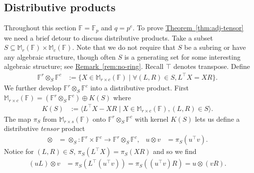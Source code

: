 \documentclass[11pt]{article}
\numberwithin{equation}{section}
\theoremstyle{definition}
\theoremstyle{plain}
\newcommand{\expref}[2]{\hyperref[#2]{#1~\ref{#2}}}
\numberwithin{equation}{section}
\theoremstyle{plain}       %
\theoremstyle{remark}
\theoremstyle{definition}
\numberwithin{figure}{section}
\numberwithin{table}{section}
\newcommand{\bbF}{\mathbb{F}}  %
\begin{document}
\subsection{Distributive products}\label{sec:tensor}
Throughout this section $\bbF=\bbF_p$ and $q=p^e$.  To prove
\expref{Theorem}{thm:adj-tensor} we need a brief detour to discuss distributive
products.  Take a subset $S\subseteq \mathbb{M}_{r}(\bbF)\times
\mathbb{M}_{c}(\bbF)$.  Note that we do not require that $S$ be a subring or
have any algebraic structure, though often $S$ is a generating set for some
interesting algebraic structure; 
%
see \expref{Remark}{rem:no-ring}.     %
Recall $\top$ denotes transpose. Define 
\begin{align}\label{def:otimes-A}
	\bbF^r\otimes_S\bbF^c & := \{X\in \mathbb{M}_{r\times c}(\bbF)\mid 
		\forall (L,R)\in S, L^\top X=XR\}.
\end{align}
We further develop $\bbF^{r}\otimes_S \bbF^c$ into a distributive product.
First $\mathbb{M}_{r\times c}(\bbF)=(\bbF^{r}\otimes_S \bbF^c)\oplus K(S)$ where
\begin{align}
	K(S) & := \langle L^\top X-XR \mid X\in\mathbb{M}_{r\times c}(\bbF), 
		(L,R)\in S\rangle.
\end{align}
The map $\pi_S$ from $\mathbb{M}_{r\times s}(\bbF)$ onto $\bbF^r\otimes_S
\bbF^c$ with kernel $K(S)$ lets us define a distributive \emph{tensor} product
\begin{align*}
\otimes & =\otimes_S:\bbF^r\times \bbF^c\to \bbF^r\otimes_S\bbF^c,
&
	u\otimes v & = \pi_S(u^\top v).
\end{align*}
Notice for $(L,R)\in S$, $\pi_S(L^\top X)=\pi_S(XR)$ and so we find
\begin{align*}
	(uL)\otimes v & = \pi_S(L^\top (u^\top v))=\pi_S((u^\top v)R)=u\otimes (vR).
\end{align*}
\end{document}
